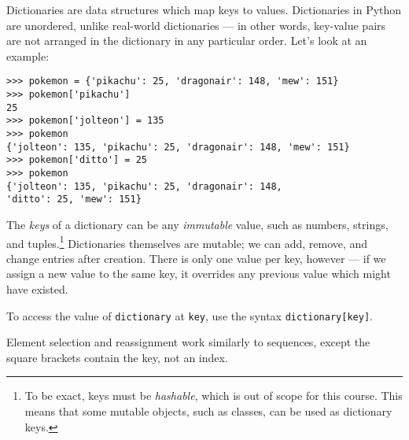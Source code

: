 Dictionaries are data structures which map keys to values.
Dictionaries in Python are unordered, unlike real-world dictionaries --- in
other words, key-value pairs are not arranged in the dictionary in any
particular order. Let's look at an example:

\begin{lstlisting}
>>> pokemon = {'pikachu': 25, 'dragonair': 148, 'mew': 151}
>>> pokemon['pikachu']
25
>>> pokemon['jolteon'] = 135
>>> pokemon
{'jolteon': 135, 'pikachu': 25, 'dragonair': 148, 'mew': 151}
>>> pokemon['ditto'] = 25
>>> pokemon
{'jolteon': 135, 'pikachu': 25, 'dragonair': 148,
'ditto': 25, 'mew': 151}
\end{lstlisting}

The {\it keys} of a dictionary can be any {\it immutable} value, such as
numbers, strings, and tuples.\footnote{To be exact, keys must be {\it
hashable}, which is out of scope for this course. This means that some
mutable objects, such as classes, can be used as dictionary keys.}
Dictionaries themselves are mutable; we can add,
remove, and change entries after creation. There is only one value per key,
however --- if we assign a new value to the same key, it overrides any previous
value which might have existed.

To access the value of {\tt dictionary} at {\tt key}, use the syntax
{\tt dictionary[key]}.

Element selection and reassignment work similarly to sequences, except the
square brackets contain the key, not an index.

